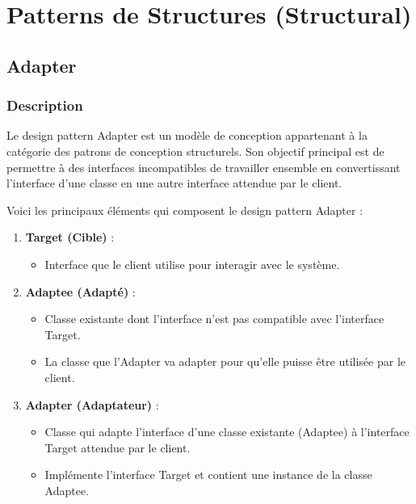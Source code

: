 \section{Patterns de Structures (Structural)}

\subsection{Adapter}


\subsubsection{Description}

Le design pattern Adapter est un modèle de conception appartenant à la catégorie des patrons de conception structurels. Son objectif principal est de permettre à des interfaces incompatibles de travailler ensemble en convertissant l'interface d'une classe en une autre interface attendue par le client.

Voici les principaux éléments qui composent le design pattern Adapter :

\begin{enumerate}[leftmargin=*,labelsep=3mm]
    \item \textbf{Target (Cible)} :
    \begin{itemize}
        \item Interface que le client utilise pour interagir avec le système.
    \end{itemize}
    
    \item \textbf{Adaptee (Adapté)} :
    \begin{itemize}
        \item Classe existante dont l'interface n'est pas compatible avec l'interface Target.
        \item La classe que l'Adapter va adapter pour qu'elle puisse être utilisée par le client.
    \end{itemize}
    
    \item \textbf{Adapter (Adaptateur)} :
    \begin{itemize}
        \item Classe qui adapte l'interface d'une classe existante (Adaptee) à l'interface Target attendue par le client.
        \item Implémente l'interface Target et contient une instance de la classe Adaptee.
    \end{itemize}
    
\end{enumerate}

